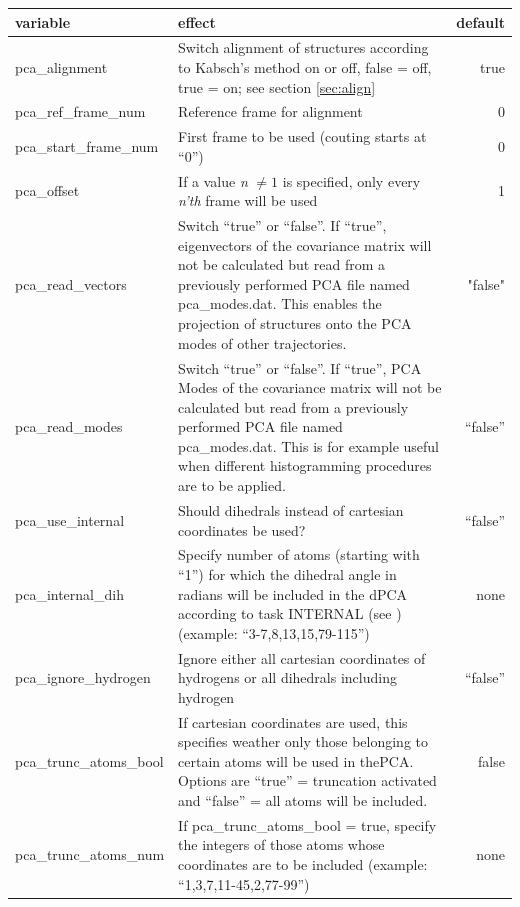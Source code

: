 \documentclass[10pt,a4paper]{article} %
\begin{document}
	\begin{tabularx}{\textwidth}{l|X|r}
		variable & effect & default\\
		\hline
		pca\_alignment & Switch alignment of structures according to Kabsch's method\cite{kabsch1, kabsch2} on or off, false = off, true = on; see section \ref{sec:align} & true\\
		pca\_ref\_frame\_num & Reference frame for alignment & 0 \\
		pca\_start\_frame\_num & First frame to be used (couting starts at ``0'') & 0 \\
		pca\_offset & If a value \textit{n} $\neq 1$ is specified, only every \textit{n'th} frame will be used & 1 \\
		pca\_read\_vectors & Switch ``true'' or ``false''. If ``true'', eigenvectors of the covariance matrix will not be calculated but read from a previously performed \ac{PCA} file named \glqq pca\_modes.dat\grqq. This enables the projection of structures onto the \ac{PCA} modes of other trajectories. & "false" \\
		pca\_read\_modes & Switch ``true'' or ``false''. If ``true'', \ac{PCA} Modes of the covariance matrix will not be calculated but read from a previously performed \ac{PCA} file named \glqq pca\_modes.dat\grqq. This is for example useful when different histogramming procedures are to be applied. & ``false'' \\
		pca\_use\_internal & Should dihedrals instead of cartesian coordinates be used? & ``false''\\
		pca\_internal\_dih & Specify number of atoms (starting with ``1'') for which the dihedral angle in radians will be included in the dPCA according to task INTERNAL (see \cite{dpca1, dpca2, dpca3}) (example: ``3-7,8,13,15,79-115'') & none\\
		pca\_ignore\_hydrogen & Ignore either all cartesian coordinates of hydrogens or all dihedrals including hydrogen & ``false'' \\
		pca\_trunc\_atoms\_bool & If cartesian coordinates are used, this specifies weather only those belonging to certain atoms will be used in the\ac{PCA}. Options are ``true'' = truncation activated and ``false'' = all atoms will be included. & false\\
		pca\_trunc\_atoms\_num & If pca\_trunc\_atoms\_bool = true, specify the integers of those atoms whose coordinates are to be included (example: ``1,3,7,11-45,2,77-99'') & none\\
		\end{tabularx}
\end{document}
